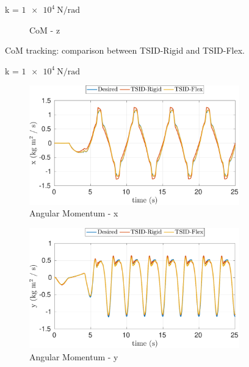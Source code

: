 \begin{figure}[!t]
\begin{myframe}{k = $\SI{1e4}{\newton \per \radian}$}
\begin{subfigure}[b]{0.49\textwidth}
        \caption{CoM - z}
    \end{subfigure}
    \end{myframe}
    \caption{CoM tracking: comparison between TSID-Rigid and TSID-Flex.\label{fig:com_tracking_10000_com_rigid_flex}}
\end{figure}
\begin{figure}[t]
    \begin{myframe}{k = $\SI{1e4}{\newton \per \radian}$}
    \centering
        \begin{subfigure}[b]{0.49\textwidth}
        \centering
        \includegraphics[width=\columnwidth]{chapter_flexible_joints/figures/comparison_10000_angular_momentum_x.pdf}
        \caption{Angular Momentum - x}
    \end{subfigure}
    \hfill
    \begin{subfigure}[b]{0.49\textwidth}
        \centering
        \includegraphics[width=\columnwidth]{chapter_flexible_joints/figures/comparison_10000_angular_momentum_y.pdf}
        \caption{Angular Momentum - y}
    \end{subfigure}
     \begin{subfigure}[b]{0.49\textwidth}

\end{subfigure}
\end{myframe}
\end{figure}
